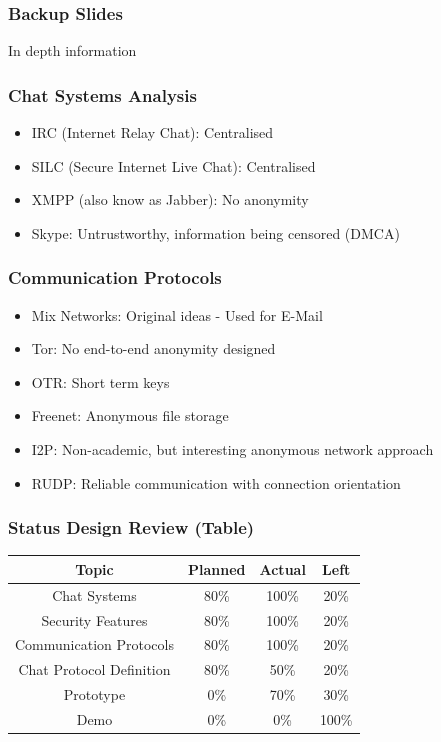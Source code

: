 \documentclass{beamer}
\begin{document}
\frame
{
  \frametitle{Backup Slides}
  \begin{center}
  In depth information
  \end{center}
}

\frame
{
  \frametitle{Chat Systems Analysis}
  \begin{itemize}
          \item IRC (Internet Relay Chat): Centralised
          \item SILC (Secure Internet Live Chat): Centralised
          \item XMPP (also know as Jabber): No anonymity
          \item Skype: Untrustworthy, information being censored (DMCA)
   \end{itemize}
}

\frame
{
  \frametitle{Communication Protocols}
    \begin{itemize}
        \item Mix Networks: Original ideas - Used for E-Mail
        \item Tor: No end-to-end anonymity designed
        \item OTR: Short term keys
        \item Freenet: Anonymous file storage
        \item I2P: Non-academic, but interesting anonymous network approach
        \item RUDP: Reliable communication with connection orientation
    \end{itemize}
}

\frame
{
    \frametitle{Status Design Review (Table)}
    \begin{center}
    \begin{tabular}{|c|c|c|c|}
    \hline
    Topic & Planned & Actual & Left\\
    \hline
    Chat Systems & 80\% & 100\% & 20\%\\
    \hline
    Security Features & 80\% & 100\% & 20\%\\
    \hline
    Communication Protocols & 80\% & 100\% & 20\%\\
    \hline
    Chat Protocol Definition & 80\% & 50\% & 20\%\\
    \hline
    Prototype & 0\% & 70\% & 30\%\\
    \hline
    Demo & 0\% & 0\% & 100\%\\
    \hline
    \end{tabular}
    \end{center}
}
\end{document}
